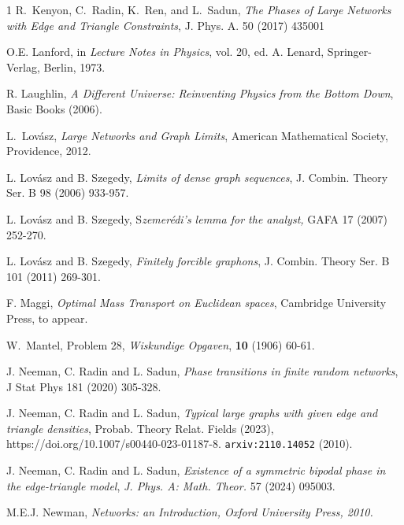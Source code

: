 \documentclass[12pt]{amsart}
\newcommand{\tet}{\textit}
\begin{document}
{\begin{thebibliography}{1}
{\sc R.~Kenyon, C.~Radin, K.~Ren, and L.~Sadun}, \textit{The Phases of Large Networks with Edge and Triangle 
Constraints}, J. Phys. A. 50 (2017) 435001

 
 {\sc O.E. Lanford}, in \tet{Lecture Notes in Physics}, vol. 20, ed. A. Lenard, Springer-Verlag, Berlin, 1973.

{\sc R. Laughlin},
{\em A Different Universe: Reinventing Physics from the Bottom Down},
Basic Books (2006).


{\sc L.~Lov\'asz}, {\em Large Networks and Graph Limits}, American Mathematical
  Society, Providence, 2012.

{\sc L. Lov\'{a}sz  and  B. Szegedy},
\textit{Limits of dense graph sequences}, 
{ J. Combin. Theory Ser. B} { 98} (2006)  933-957.

{\sc L. Lov\'{a}sz  and  B. Szegedy},
S\tet{zemer\'edi's lemma for the analyst,}
{ GAFA} { 17} (2007)  252-270.

{\sc L. Lov\'{a}sz  and  B. Szegedy},
\textit{Finitely forcible graphons},
{ J. Combin. Theory Ser. B} {101} (2011) 269-301.


 {\sc F. Maggi}, \textit{Optimal Mass Transport on Euclidean spaces}, Cambridge University Press, to appear.

 {\sc W.\ Mantel}, Problem 28, \textit{Wiskundige Opgaven}, {\bf 10} (1906)
60-61.



 {\sc  J. Neeman, C. Radin and L. Sadun}, \textit{Phase transitions in finite random
 networks}, J Stat Phys 181 (2020) 305-328.  
 
 {\sc J. Neeman, C. Radin and L. Sadun}, \textit{Typical large graphs with given edge and triangle densities}, Probab. Theory Relat. Fields (2023), https://doi.org/10.1007/s00440-023-01187-8. \texttt{arxiv:2110.14052} (2010).

 {\sc J. Neeman, C. Radin and L. Sadun}, \textit{Existence of a symmetric bipodal phase in the edge-triangle model}, \textit{J. Phys. A: Math. Theor.} 57 (2024) 095003.


 {\sc M.E.J. Newman}, \textit{Networks: an Introduction, Oxford
  University Press, 2010.}


\end{thebibliography}}
\end{document}

